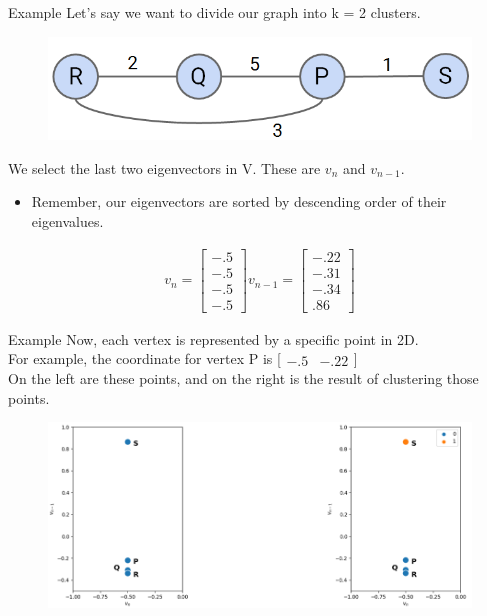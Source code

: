 \documentclass[aspectratio=169]{../latex_main/tntbeamer}  %
\begin{document}
	\begin{frame}{Example}
	    Let’s say we want to divide our graph into k = 2 clusters.
	    \begin{figure}
	        \centering
	        \includegraphics[scale=.5]{Bild15}
	    \end{figure}
	    We select the last two eigenvectors in V. These are $v_n$ and $v_{n-1}$.
	    \begin{itemize}
	        \item Remember, our eigenvectors are sorted by descending order of their eigenvalues. 
	    \end{itemize}
        \begin{align*}
            v_n = \left[\begin{array}{c}
                 -.5 \\
                 -.5\\
                 -.5\\
                 -.5
            \end{array}\right]
            v_{n-1} = \left[\begin{array}{c}
                 -.22  \\
                 -.31 \\
                 -.34 \\
                 .86
            \end{array}\right]
        \end{align*}
	\end{frame}
	
	
	\begin{frame}{Example}
	    Now, each vertex is represented by a specific point in 2D.\\
        For example, the coordinate for vertex P is [$\begin{array}{cc}
             -.5   & -.22 
            \end{array}$]\\
        On the left are these points, and on the right is the result of clustering those points.
        \begin{figure}
            \centering
            \includegraphics[scale=.45]{Bild16}
        \end{figure}
	\end{frame}
\end{document}
